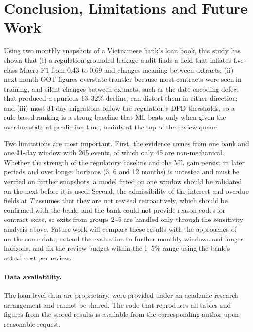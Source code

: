 \documentclass[runningheads]{llncs}
\begin{document}
\section{Conclusion, Limitations and Future Work}
\label{sec:conclusion}

Using two monthly snapshots of a Vietnamese bank's loan book, this study has shown that (i) a regulation-grounded leakage audit finds a field that inflates five-class Macro-F1 from 0.43 to 0.69 and changes meaning between extracts; (ii) next-month OOT figures overstate transfer because most contracts were seen in training, and silent changes between extracts, such as the date-encoding defect that produced a spurious 13--32\% decline, can distort them in either direction; and (iii) most 31-day migrations follow the regulation's DPD thresholds, so a rule-based ranking is a strong baseline that ML beats only when given the overdue state at prediction time, mainly at the top of the review queue.

Two limitations are most important. First, the evidence comes from one bank and one 31-day window with 265 events, of which only 45 are non-mechanical. Whether the strength of the regulatory baseline and the ML gain persist in later periods and over longer horizons (3, 6 and 12 months) is untested and must be verified on further snapshots; a model fitted on one window should be validated on the next before it is used. Second, the admissibility of the interest and overdue fields at $T$ assumes that they are not revised retroactively, which should be confirmed with the bank; and the bank could not provide reason codes for contract exits, so exits from groups 2--5 are handled only through the sensitivity analysis above. Future work will compare these results with the approaches of~\cite{nguyen2025boosting,nguyen2024ews} on the same data, extend the evaluation to further monthly windows and longer horizons, and fix the review budget within the 1--5\% range using the bank's actual cost per review.

\paragraph{Data availability.} The loan-level data are proprietary, were provided under an academic research arrangement and cannot be shared. The code that reproduces all tables and figures from the stored results is available from the corresponding author upon reasonable request.
\end{document}
